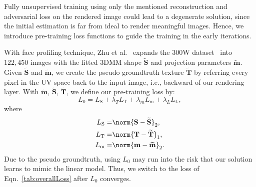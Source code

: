 Fully unsupervised training using only the mentioned reconstruction and adversarial loss on the rendered image could lead to a degenerate solution, since the initial estimation is far from ideal to render meaningful images. 
Hence, we introduce pre-training loss functions to guide the training in the early iterations.

With face profiling technique, Zhu et al.~\cite{zhu2016face} expands the 300W dataset~\cite{sagonas2016300} into $122,450$ images with the fitted 3DMM shape $\widetilde{\mathbf{S}}$ and projection parameters $\widetilde{\mathbf{m}}$. 
Given $\widetilde{\mathbf{S}}$ and $\widetilde{\mathbf{m}}$, we create the pseudo groundtruth texture $\widetilde{\mathbf{T}}$ by referring every pixel in the UV space back to the input image, i.e., backward of our rendering layer. 
With $\widetilde{\mathbf{m}}$, $\widetilde{\mathbf{S}}$, $\widetilde{\mathbf{T}}$, we define our pre-training loss by: 
\begin{equation}
L_0 = L_{\text{S}} + \lambda_T L_{\text{T}} + \lambda_m L_{\text{m}} + \lambda_L L_{\text{L}},
\end{equation}
where
\begin{align}
L_{\text{S}} = & \norm{ \mathbf{S}-\mathbf{\widetilde{S}} }_2, \\
L_{\text{T}} = & \norm{ \mathbf{T}-\mathbf{\widetilde{T}} }_1, \\
L_{\text{m}} = & \norm{ \mathbf{m}-\mathbf{\widetilde{m}} }_2. 
\end{align}
Due to the pseudo groundtruth, using $L_0$ may run into the risk that our solution learns to mimic the linear model. 
Thus, we switch to the loss of Eqn.~\ref{tab:overallLoss} after $L_0$ converges.


